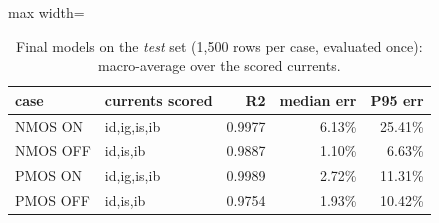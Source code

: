\begin{table}[H]
\centering
{\small
\begin{adjustbox}{max width=\linewidth}
\begin{tabular}{llrrr}
\toprule
case & currents scored & R2 & median err & P95 err \\
\midrule
NMOS ON & id,ig,is,ib & 0.9977 & 6.13\% & 25.41\% \\
NMOS OFF & id,is,ib & 0.9887 & 1.10\% & 6.63\% \\
PMOS ON & id,ig,is,ib & 0.9989 & 2.72\% & 11.31\% \\
PMOS OFF & id,is,ib & 0.9754 & 1.93\% & 10.42\% \\
\bottomrule
\end{tabular}
\end{adjustbox}
}
\caption{Final models on the \emph{test} set (1{,}500 rows per case, evaluated once): macro-average over the scored currents.}
\label{tab:chosen_macro}
\end{table}


